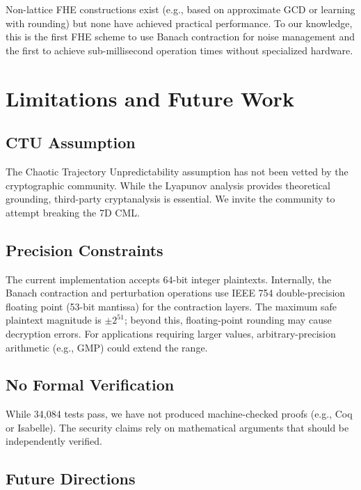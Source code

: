 \documentclass[11pt,a4paper]{article}
\begin{document}
Non-lattice FHE constructions exist (e.g., based on approximate GCD or learning with rounding) but none have achieved practical performance. To our knowledge, this is the first FHE scheme to use Banach contraction for noise management and the first to achieve sub-millisecond operation times without specialized hardware.

\section{Limitations and Future Work}
\label{sec:limit}

\subsection{CTU Assumption}

The Chaotic Trajectory Unpredictability assumption has not been vetted by the cryptographic community. While the Lyapunov analysis provides theoretical grounding, third-party cryptanalysis is essential. We invite the community to attempt breaking the 7D CML.

\subsection{Precision Constraints}

The current implementation accepts 64-bit integer plaintexts. Internally, the Banach contraction and perturbation operations use IEEE 754 double-precision floating point (53-bit mantissa) for the contraction layers. The maximum safe plaintext magnitude is $\pm 2^{51}$; beyond this, floating-point rounding may cause decryption errors. For applications requiring larger values, arbitrary-precision arithmetic (e.g., GMP) could extend the range.

\subsection{No Formal Verification}

While 34,084 tests pass, we have not produced machine-checked proofs (e.g., Coq or Isabelle). The security claims rely on mathematical arguments that should be independently verified.

\subsection{Future Directions}
\end{document}
